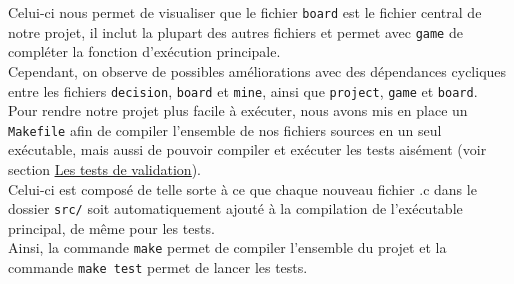 \noindent Celui-ci nous permet de visualiser que le fichier \texttt{board} est le fichier central de notre projet, il inclut la plupart des autres fichiers et permet avec \texttt{game} de compléter la fonction d'exécution principale.\\
Cependant, on observe de possibles améliorations avec des dépendances cycliques entre les fichiers \texttt{decision}, \texttt{board} et \texttt{mine}, ainsi que \texttt{project}, \texttt{game} et \texttt{board}.\\
Pour rendre notre projet plus facile à exécuter, nous avons mis en place un \texttt{Makefile} afin de compiler l'ensemble de nos fichiers sources en un seul exécutable, mais aussi de pouvoir compiler et exécuter les tests aisément (voir section \hyperref[sec:tests]{\uline{Les tests de validation}}).\\
Celui-ci est composé de telle sorte à ce que chaque nouveau fichier .c dans le dossier \texttt{src/} soit automatiquement ajouté à la compilation de l'exécutable principal, de même pour les tests. \\
Ainsi, la commande \texttt{make} permet de compiler l'ensemble du projet et la commande \texttt{make test} permet de lancer les tests.

